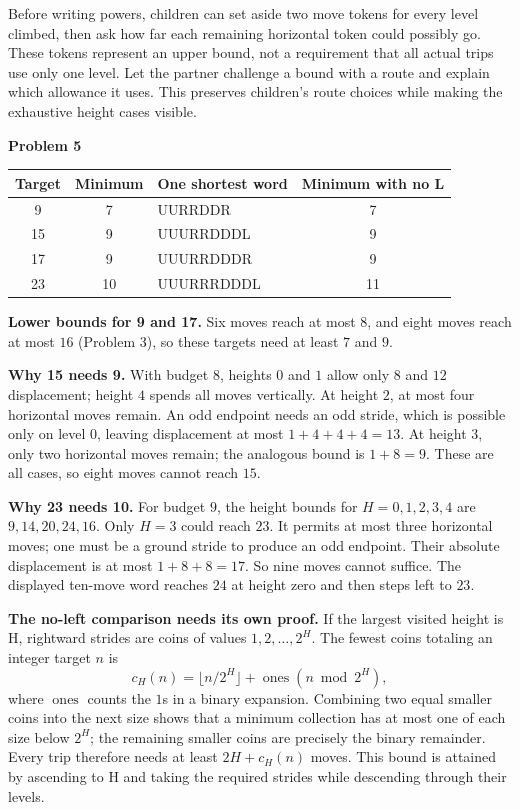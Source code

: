 \documentclass[11pt,letterpaper]{article}
\newcommand{\sect}[1]{\par\vspace{5pt}{\large\bfseries #1}\par\nopagebreak}
\newcommand{\prob}[1]{\par\vspace{3pt}\textbf{Problem #1}\par}
\begin{document}
\sect{Keep the argument concrete}
Before writing powers, children can set aside two move tokens for every level
climbed, then ask how far each remaining horizontal token could possibly go.
These tokens represent an upper bound, not a requirement that all actual trips
use only one level. Let the partner challenge a bound with a route and explain
which allowance it uses. This preserves children's route choices while making
the exhaustive height cases visible.

\prob{5}
\begin{center}
\begin{tabular}{@{}cclc@{}}\toprule
Target & Minimum & One shortest word & Minimum with no L\\\midrule
9 & 7 & UURRDDR & 7\\
15 & 9 & UUURRDDDL & 9\\
17 & 9 & UUURRDDDR & 9\\
23 & 10 & UUURRRDDDL & 11\\\bottomrule
\end{tabular}
\end{center}
\textbf{Lower bounds for 9 and 17.} Six moves reach at most $8$, and eight
moves reach at most $16$ (Problem 3), so these targets need at least $7$ and $9$.

\textbf{Why 15 needs 9.} With budget $8$, heights $0$ and $1$ allow only $8$
and $12$ displacement; height $4$ spends all moves vertically. At height $2$,
at most four horizontal moves remain. An odd endpoint needs an odd stride,
which is possible only on level $0$, leaving displacement at most
$1+4+4+4=13$. At height $3$, only two horizontal moves remain; the analogous
bound is $1+8=9$. These are all cases, so eight moves cannot reach $15$.

\textbf{Why 23 needs 10.} For budget $9$, the height bounds for
$H=0,1,2,3,4$ are $9,14,20,24,16$. Only $H=3$ could reach $23$.
It permits at most three horizontal moves; one must be a ground stride to
produce an odd endpoint. Their absolute displacement is at most $1+8+8=17$.
So nine moves cannot suffice. The displayed ten-move word reaches $24$ at
height zero and then steps left to $23$.

\textbf{The no-left comparison needs its own proof.} If the largest visited
height is H, rightward strides are coins of values $1,2,\ldots,2^H$.
The fewest coins totaling an integer target $n$ is
\[
 c_H(n)=\lfloor n/2^H\rfloor+\operatorname{ones}(n\bmod2^H),
\]
where $\operatorname{ones}$ counts the $1$s in a binary expansion. Combining
two equal smaller coins into the next size shows that a minimum collection has
at most one of each size below $2^H$; the remaining smaller coins are precisely
the binary remainder. Every trip therefore needs at least $2H+c_H(n)$ moves.
This bound is attained by ascending to H and taking the required strides while
descending through their levels.
\end{document}
